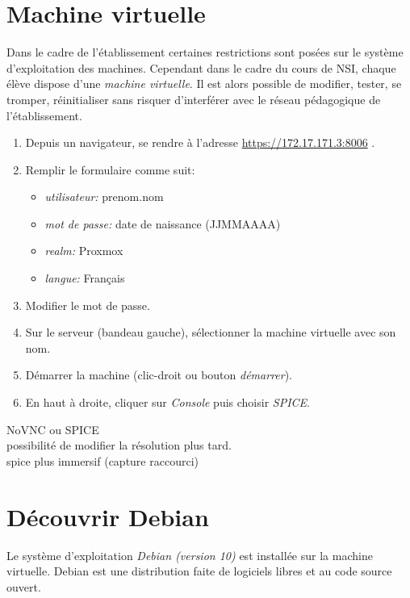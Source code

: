 \documentclass[a4paper,11pt]{article}
\begin{document}
\section{Machine virtuelle}
Dans le cadre de l'établissement certaines restrictions sont posées sur le système d'exploitation des machines. Cependant dans le cadre du cours de NSI, chaque élève dispose d'une \emph{machine virtuelle}. Il est alors possible de modifier, tester, se tromper, réinitialiser sans risquer d'interférer avec le réseau pédagogique de l'établissement.
\begin{activite}
    \begin{enumerate}
        \item Depuis un navigateur, se rendre à l'adresse \url{https://172.17.171.3:8006} .
        \item Remplir le formulaire comme suit:
              \begin{itemize}
                  \item \emph{utilisateur:} prenom.nom
                  \item \emph{mot de passe:} date de naissance (JJMMAAAA)
                  \item \emph{realm:} Proxmox
                  \item \emph{langue:} Français
              \end{itemize}
        \item Modifier le mot de passe.
        \item Sur le serveur (bandeau gauche), sélectionner la machine virtuelle avec son nom.
        \item Démarrer la machine (clic-droit ou bouton \emph{démarrer}).
        \item En haut à droite, cliquer sur \emph{Console} puis choisir \emph{SPICE}.
    \end{enumerate}
\end{activite}
\begin{commentprof}
NoVNC ou SPICE\\ possibilité de modifier la résolution plus tard.\\ spice plus immersif (capture raccourci)
\end{commentprof}
\section{Découvrir Debian}
Le système d'exploitation \emph{Debian (version 10)} est installée sur la machine virtuelle. Debian est une distribution faite de logiciels libres et au code source ouvert.
\end{document}
